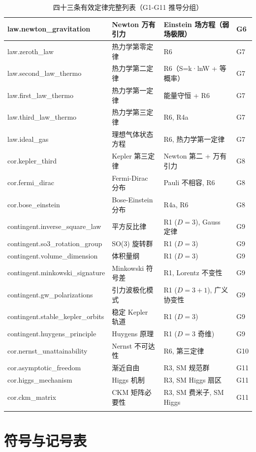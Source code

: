 \documentclass[11pt,a4paper,openany]{book}
\begin{document}
\begin{center}
\begin{longtable}{>{\ttfamily\footnotesize}p{2.5cm}p{3.5cm}p{4.5cm}p{4.5cm}}
law.newton\_gravitation & Newton 万有引力 & Einstein 场方程（弱场极限） & G6 \\
\midrule
law.zeroth\_law & 热力学第零定律 & R6 & G7 \\
law.second\_law\_thermo & 热力学第二定律 & R6（S=k·lnW + 等概率） & G7 \\
law.first\_law\_thermo & 热力学第一定律 & 能量守恒 + R6 & G7 \\
law.third\_law\_thermo & 热力学第三定律 & R6, R4a & G7 \\
law.ideal\_gas & 理想气体状态方程 & R6, 热力学第一定律 & G7 \\
\midrule
cor.kepler\_third & Kepler 第三定律 & Newton 第二 + 万有引力 & G8 \\
cor.fermi\_dirac & Fermi-Dirac 分布 & Pauli 不相容, R6 & G8 \\
cor.bose\_einstein & Bose-Einstein 分布 & R4a, R6 & G8 \\
\midrule
contingent.inverse\_square\_law & 平方反比律 & R1 ($D=3$), Gauss 定律 & G9 \\
contingent.so3\_rotation\_group & SO(3) 旋转群 & R1 ($D=3$) & G9 \\
contingent.volume\_dimension & 体积量纲 & R1 ($D=3$) & G9 \\
contingent.minkowski\_signature & Minkowski 符号差 & R1, Lorentz 不变性 & G9 \\
contingent.gw\_polarizations & 引力波极化模式 & R1 ($D=3+1$), 广义协变性 & G9 \\
contingent.stable\_kepler\_orbits & 稳定 Kepler 轨道 & R1 ($D=3$) & G9 \\
contingent.huygens\_principle & Huygens 原理 & R1 ($D=3$ 奇维) & G9 \\
\midrule
cor.nernst\_unattainability & Nernst 不可达性 & R6, 第三定律 & G10 \\
\midrule
cor.asymptotic\_freedom & 渐近自由 & R3, SM 规范群 & G11 \\
cor.higgs\_mechanism & Higgs 机制 & R3, SM Higgs 扇区 & G11 \\
cor.ckm\_matrix & CKM 矩阵必要性 & R3, SM 费米子, SM Higgs & G11 \\
\bottomrule
\caption{四十三条有效定律完整列表（G1-G11 推导分组）}
\end{longtable}
\end{center}

\chapter{符号与记号表}
\label{app:symbols}
\end{document}

